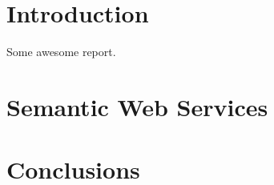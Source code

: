 \section{Introduction}

Some awesome report\cite{durand_deploying_2001}.

\section{Semantic Web Services}

\section{Conclusions}
